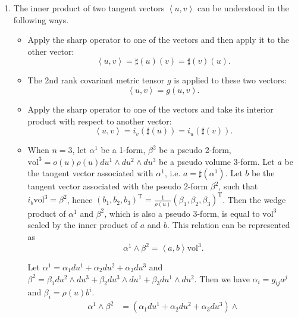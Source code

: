 \documentclass[11pt, a4paper]{book}
\begin{document}
\begin{enumerate}
\item The inner product of two tangent vectors $\left\langle u,v \right\rangle$ can be
  understood in the following ways.
  \begin{itemize}
  \item Apply the sharp operator to one of the vectors and then apply it to the other
    vector:
    \begin{equation}
      \left\langle u,v \right\rangle = \sharp(u)(v) = \sharp(v)(u).
    \end{equation}
  \item The 2nd rank covariant metric tensor $g$ is applied to these two vectors:
    \begin{equation}
      \left\langle u,v \right\rangle = g(u,v).
    \end{equation}
  \item Apply the sharp operator to one of the vectors and take its interior product with
    respect to another vector:
    \begin{equation}
      \left\langle u,v \right\rangle = i_v \left( \sharp(u) \right) = i_u \left( \sharp(v) \right).
    \end{equation}
  \item When $n=3$, let $\alpha^1$ be a 1-form, $\beta^2$ be a pseudo 2-form,
    $\mathrm{vol}^3 = o(u) \rho(u) du^1 \wedge du^2 \wedge du^3$ be a pseudo volume
    3-form. Let $a$ be the tangent vector associated with $\alpha^1$, i.e.
    $a = \sharp(\alpha^1)$. Let $b$ be the tangent vector associated with the pseudo
    2-form $\beta^2$, such that $i_b \mathrm{vol}^3 = \beta^2$, hence
    $(b_1,b_2,b_3)^{\mathrm{T}} = \frac{1}{\rho(u)}
    (\beta_1,\beta_2,\beta_3)^{\mathrm{T}}$. Then the wedge product of $\alpha^1$
    and $\beta^2$, which is also a pseudo 3-form, is equal to $\mathrm{vol}^3$ scaled by
    the inner product of $a$ and $b$. This relation can be represented as
    \begin{equation}
      \alpha^1 \wedge \beta^2 = \left\langle a,b \right\rangle \mathrm{vol}^3.
    \end{equation}
    \begin{Proof}
      Let $\alpha^1 = \alpha_1 du^1 + \alpha_2 du^2 + \alpha_3 du^3$ and
      $\beta^2 = \beta_1 du^2 \wedge du^3 + \beta_2 du^3 \wedge du^1 + \beta_3 du^1 \wedge
      du^2$. Then we have $\alpha_i = g_{ij} a^j$ and $\beta_i = \rho(u) b^i$.
      \begin{align*}
        \alpha^1 \wedge \beta^2
        &= (\alpha_1 du^1 + \alpha_2 du^2 + \alpha_3 du^3) \wedge

\end{align*}
\end{Proof}
\end{itemize}
\end{enumerate}
\end{document}
